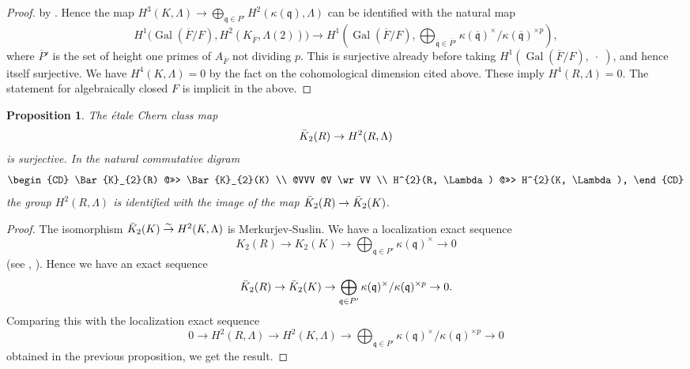 \documentclass{amsart}
\newtheorem{Prop}[Thm]{Proposition}
\theoremstyle{remark}
\numberwithin{equation}{subsection}
\newcommand{\isomto}{\overset{\sim}{\to}}
\newcommand{\closure}[1]{\overline{#1}}
\newcommand{\var}{\;\cdot\;}
\newcommand{\ideal}[1]{\mathfrak{#1}}
\DeclareMathOperator{\Gal}{Gal}
\begin{document}
\begin{proof}
	by \cite[Theorem (5.1)]{Sai86}.
	Hence the map
	$H^{3}(K, \Lambda) \to \bigoplus_{\ideal{q} \in P'} H^{2}(\kappa(\ideal{q}), \Lambda)$
	can be identified with the natural map
		\[
				H^{1} \bigl(
					\Gal(\closure{F} / F),
					H^{2}(K_{\closure{F}}, \Lambda(2))
				\bigl)
			\to
				H^{1} \left(
					\Gal(\closure{F} / F),
					\bigoplus_{\closure{\ideal{q}} \in \closure{P}'}
							\kappa(\closure{\ideal{q}})^{\times}
						/
							\kappa(\closure{\ideal{q}})^{\times p}
				\right),
		\]
	where $\closure{P}'$ is the set of height one primes of $A_{\closure{F}}$ not dividing $p$.
	This is surjective already before taking $H^{1}(\Gal(\closure{F} / F), \var)$,
	and hence itself surjective.
	We have $H^{4}(K, \Lambda) = 0$ by the fact on the cohomological dimension cited above.
	These imply $H^{4}(R, \Lambda) = 0$.
	The statement for algebraically closed $F$ is implicit in the above.
\end{proof}

\begin{Prop} \label{0064}
	The \'etale Chern class map \cite[Chapter V, Example 11.10]{Wei13}
		\[
				\Bar{K}_{2}(R)
			\to
				H^{2}(R, \Lambda)
		\]
	is surjective.
	In the natural commutative digram
		\[
			\begin{CD}
					\Bar{K}_{2}(R)
				@>>>
					\Bar{K}_{2}(K)
				\\ @VVV @V \wr VV \\
					H^{2}(R, \Lambda)
				@>>>
					H^{2}(K, \Lambda),
			\end{CD}
		\]
	the group $H^{2}(R, \Lambda)$ is identified with the image of the map
	$\Bar{K}_{2}(R) \to \Bar{K}_{2}(K)$.
\end{Prop}

\begin{proof}
	The isomorphism
	$\Bar{K}_{2}(K) \isomto H^{2}(K, \Lambda)$
	is Merkurjev-Suslin.
	We have a localization exact sequence
		\[
				K_{2}(R)
			\to
				K_{2}(K)
			\to
				\bigoplus_{\ideal{q} \in P'}
					\kappa(\ideal{q})^{\times}
			\to
				0
		\]
	(see \cite[Chapter V, (6.6.1)]{Wei13}, \cite[Lemma (1.16)]{Sai87}).
	Hence we have an exact sequence
		\[
				\Bar{K}_{2}(R)
			\to
				\Bar{K}_{2}(K)
			\to
				\bigoplus_{\ideal{q} \in P'}
					\kappa(\ideal{q})^{\times} / \kappa(\ideal{q})^{\times p}
			\to
				0.
		\]
	Comparing this with the localization exact sequence
		\begin{equation} \label{0065}
				0
			\to
				H^{2}(R, \Lambda)
			\to
				H^{2}(K, \Lambda)
			\to
				\bigoplus_{\ideal{q} \in P'}
					\kappa(\ideal{q})^{\times} / \kappa(\ideal{q})^{\times p}
			\to
				0
		\end{equation}
	obtained in the previous proposition, we get the result.
\end{proof}
\end{document}
